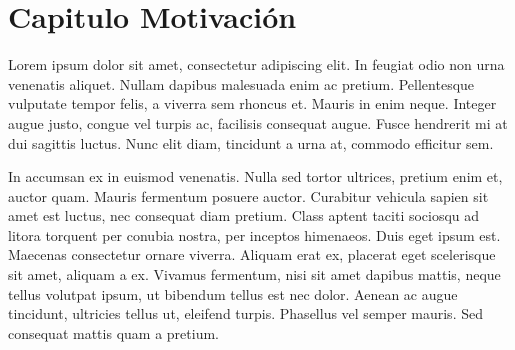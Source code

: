 \documentclass[letterpaper,twoside,10pt]{report}
\begin{document}
\pagestyle{empty} %





\tableofcontents %
\cleardoublepage %

\pagestyle{plain} %







\chapter{Capitulo Motivación}\label{motivacion}

Lorem ipsum dolor sit amet, consectetur adipiscing elit. In feugiat odio non urna venenatis aliquet. Nullam dapibus malesuada enim ac pretium. Pellentesque vulputate tempor felis, a viverra sem rhoncus et. Mauris in enim neque. Integer augue justo, congue vel turpis ac, facilisis consequat augue. Fusce hendrerit mi at dui sagittis luctus. Nunc elit diam, tincidunt a urna at, commodo efficitur sem.

In accumsan ex in euismod venenatis. Nulla sed tortor ultrices, pretium enim et, auctor quam. Mauris fermentum posuere auctor. Curabitur vehicula sapien sit amet est luctus, nec consequat diam pretium. Class aptent taciti sociosqu ad litora torquent per conubia nostra, per inceptos himenaeos. Duis eget ipsum est. Maecenas consectetur ornare viverra. Aliquam erat ex, placerat eget scelerisque sit amet, aliquam a ex. Vivamus fermentum, nisi sit amet dapibus mattis, neque tellus volutpat ipsum, ut bibendum tellus est nec dolor. Aenean ac augue tincidunt, ultricies tellus ut, eleifend turpis. Phasellus vel semper mauris. Sed consequat mattis quam a pretium.
\end{document}
